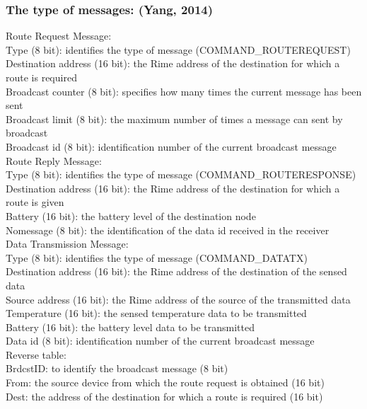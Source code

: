 \documentclass[a4paper]{article}
\begin{document}
\subsubsection*{The type of messages: (Yang, 2014)} 
Route Request Message:\\
Type (8 bit): identifies the type of message (COMMAND\_ROUTEREQUEST)\\
Destination address (16 bit):  the Rime address of the destination for which a route is required \\
Broadcast counter (8 bit): specifies how many times the current message has been sent \\
Broadcast limit (8 bit): the maximum number of times a message can sent by broadcast \\
Broadcast id (8 bit): identification number of the current broadcast message \\

Route Reply Message: \\
Type (8 bit): identifies the type of message (COMMAND\_ROUTERESPONSE)\\
Destination address (16 bit):  the Rime address of the destination for which a route is given \\
Battery (16 bit): the battery level of the destination node \\
Nomessage (8 bit): the identification of the data id received in the receiver \\

Data Transmission Message:\\
Type (8 bit): identifies the type of message (COMMAND\_DATATX) \\
Destination address (16 bit):  the Rime address of the destination of the sensed data \\
Source address (16 bit):  the Rime address of the source of the transmitted data \\
Temperature (16 bit): the sensed temperature data to be transmitted \\
Battery (16 bit): the battery level data to be transmitted \\
Data id (8 bit): identification number of the current broadcast message \\

Reverse table: \\
BrdcstID: to identify the broadcast message (8 bit) \\
From: the source device from which the route request is obtained (16 bit) \\
Dest: the address of the destination for which a route is required (16 bit) \\
\end{document}
